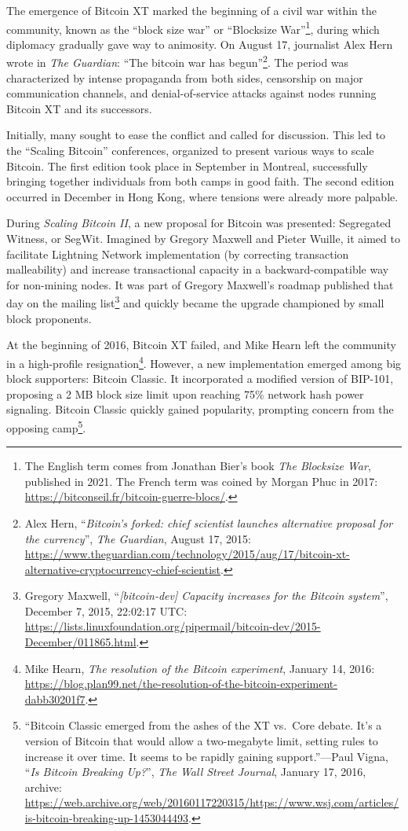 \documentclass[
  a5paper,
  smalldemyvopaper,10pt,twoside,onecolumn,openright,extrafontsizes,hidelinks]{memoir}
\begin{document}
The emergence of Bitcoin XT marked the beginning of a civil war within
the community, known as the ``block size war'' or ``Blocksize
War''\footnote{The English term comes from Jonathan Bier's book
  \emph{The Blocksize War}, published in 2021. The French term was
  coined by Morgan Phuc in 2017:
  \url{https://bitconseil.fr/bitcoin-guerre-blocs/}.}, during which
diplomacy gradually gave way to animosity. On August 17, journalist Alex
Hern wrote in \emph{The Guardian}: ``The bitcoin war has
begun''\footnote{Alex Hern, ``\emph{Bitcoin's forked: chief scientist
  launches alternative proposal for the currency}'', \emph{The
  Guardian}, August 17, 2015:
  \url{https://www.theguardian.com/technology/2015/aug/17/bitcoin-xt-alternative-cryptocurrency-chief-scientist}.}.
The period was characterized by intense propaganda from both sides,
censorship on major communication channels, and denial-of-service
attacks against nodes running Bitcoin XT and its successors.

Initially, many sought to ease the conflict and called for discussion.
This led to the ``Scaling Bitcoin'' conferences, organized to present
various ways to scale Bitcoin. The first edition took place in September
in Montreal, successfully bringing together individuals from both camps
in good faith. The second edition occurred in December in Hong Kong,
where tensions were already more palpable.

During \emph{Scaling Bitcoin II}, a new proposal for Bitcoin was
presented: Segregated Witness, or SegWit. Imagined by Gregory Maxwell
and Pieter Wuille, it aimed to facilitate Lightning Network
implementation (by correcting transaction malleability) and increase
transactional capacity in a backward-compatible way for non-mining
nodes. It was part of Gregory Maxwell's roadmap published that day on
the mailing list\footnote{Gregory Maxwell, ``\emph{{[}bitcoin-dev{]}
  Capacity increases for the Bitcoin system}'', December 7, 2015,
  22:02:17 UTC:
  \url{https://lists.linuxfoundation.org/pipermail/bitcoin-dev/2015-December/011865.html}.}
and quickly became the upgrade championed by small block proponents.

At the beginning of 2016, Bitcoin XT failed, and Mike Hearn left the
community in a high-profile resignation\footnote{Mike Hearn, \emph{The
  resolution of the Bitcoin experiment}, January 14, 2016:
  \url{https://blog.plan99.net/the-resolution-of-the-bitcoin-experiment-dabb30201f7}.}.
However, a new implementation emerged among big block supporters:
Bitcoin Classic. It incorporated a modified version of BIP-101,
proposing a 2 MB block size limit upon reaching 75\% network hash power
signaling. Bitcoin Classic quickly gained popularity, prompting concern
from the opposing camp\footnote{``Bitcoin Classic emerged from the ashes
  of the XT vs.~Core debate. It's a version of Bitcoin that would allow
  a two-megabyte limit, setting rules to increase it over time. It seems
  to be rapidly gaining support.''---Paul Vigna, ``\emph{Is Bitcoin
  Breaking Up?}'', \emph{The Wall Street Journal}, January 17, 2016,
  archive:
  \url{https://web.archive.org/web/20160117220315/https://www.wsj.com/articles/is-bitcoin-breaking-up-1453044493}.}.
\end{document}
